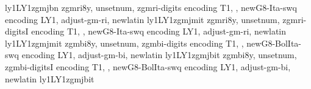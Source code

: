 {ly1}{LY1}{zgmj}{b}{n}{}
%
{zgmri8y,%
unsetnum,%
zgmri-digits encoding T1,%
\metrics {},%
newG8-Ita-swq encoding LY1,%
adjust-gm-ri,%
newlatin}
{ly1}{LY1}{zgmj}{m}{it}{}
%
{zgmri8y,%
unsetnum,%
zgmri-digitsI encoding T1,%
\metrics {},%
newG8-Ita-swq encoding LY1,%
adjust-gm-ri,%
newlatin}
{ly1}{LY1}{zgmj}{m}{it}{}
%
{zgmbi8y,%
unsetnum,%
zgmbi-digits encoding T1,%
\metrics {},%
newG8-BolIta-swq encoding LY1,%
adjust-gm-bi,%
newlatin}
{ly1}{LY1}{zgmj}{b}{it}{}
%
{zgmbi8y,%
unsetnum,%
zgmbi-digitsI encoding T1,%
\metrics {},%
newG8-BolIta-swq encoding LY1,%
adjust-gm-bi,%
newlatin}
{ly1}{LY1}{zgmj}{b}{it}{}

\endinstallfonts
\endrecordtransforms
\bye
